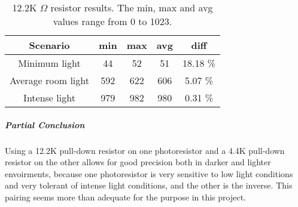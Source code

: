 \begin{table}[htbp]
  \centering
  \begin{tabular}{c c c c c}
    \toprule
    Scenario & min & max & avg & diff \\ \midrule
    Minimum light & 44 & 52 & 51 & 18.18 \% \\
    Average room light & 592 & 622 & 606 & 5.07 \% \\
    Intense light & 979 & 982 & 980 & 0.31 \% \\ \bottomrule
  \end{tabular}
  \caption{12.2K $\Omega$ resistor results. The min, max and avg values range from 0 to 1023.}\label{tab:12.2KTestResults}
\end{table}

\subparagraph{Partial Conclusion}
Using a 12.2K pull-down resistor on one photoresistor and a 4.4K pull-down resistor on the other allows for good precision both in darker and lighter envoirments, because one photoresistor is very sensitive to low light conditions and very tolerant of intense light conditions, and the other is the inverse. This pairing seems more than adequate for the purpose in this project.
